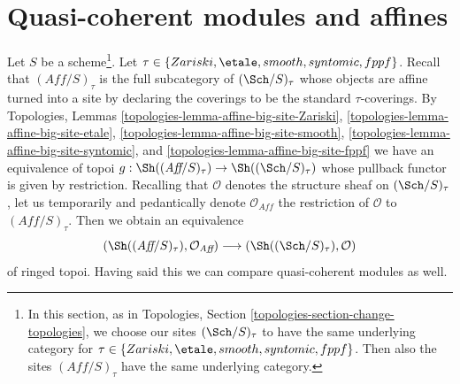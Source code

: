 \section{Quasi-coherent modules and affines}
\label{descent-section-alternative-quasi-coherent}
Let $S$ be a scheme\footnote{In this section, as in
Topologies, Section \ref{topologies-section-change-topologies},
we choose our sites $(\Sch/S)_\tau$ to have the same underlying category
for $\tau \in \{Zariski, \etale, smooth, syntomic, fppf\}$. Then also
the sites $(\textit{Aff}/S)_\tau$ have the same underlying category.}.
Let $\tau \in \{Zariski, \etale, smooth, syntomic, fppf\}$.
Recall that $(\textit{Aff}/S)_\tau$ is the full subcategory
of $(\Sch/S)_\tau$ whose objects are affine turned into
a site by declaring the coverings to be the standard $\tau$-coverings.
By Topologies, Lemmas
\ref{topologies-lemma-affine-big-site-Zariski},
\ref{topologies-lemma-affine-big-site-etale},
\ref{topologies-lemma-affine-big-site-smooth},
\ref{topologies-lemma-affine-big-site-syntomic}, and
\ref{topologies-lemma-affine-big-site-fppf}
we have an equivalence of topoi
$g : \Sh((\textit{Aff}/S)_\tau) \to \Sh((\Sch/S)_\tau)$
whose pullback functor is given by restriction.
Recalling that $\mathcal{O}$ denotes the structure sheaf on
$(\Sch/S)_\tau$, let us temporarily and pedantically
denote $\mathcal{O}_{\textit{Aff}}$
the restriction of $\mathcal{O}$ to $(\textit{Aff}/S)_\tau$.
Then we obtain an equivalence
\begin{equation}
\label{equation-alternative-ringed}
(\Sh((\textit{Aff}/S)_\tau), \mathcal{O}_{\textit{Aff}})
\longrightarrow
(\Sh((\Sch/S)_\tau), \mathcal{O})
\end{equation}
of ringed topoi. Having said this we can compare quasi-coherent modules
as well.

